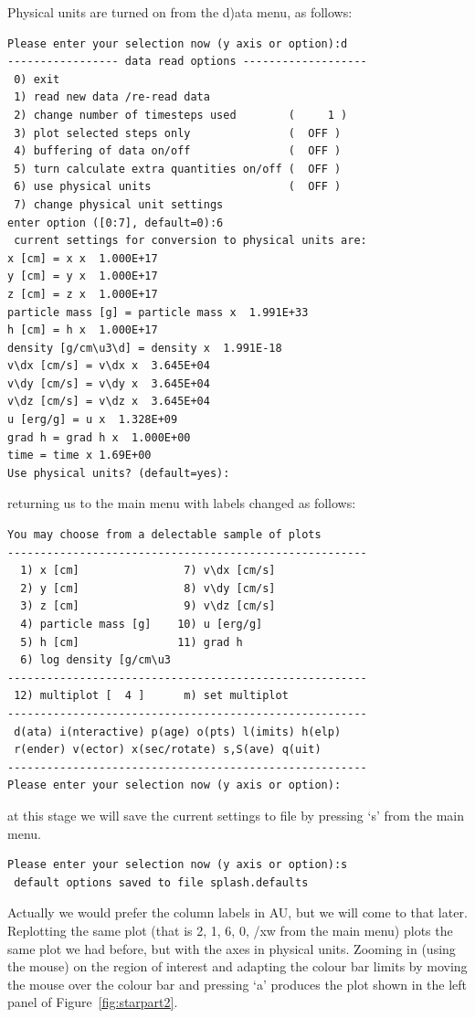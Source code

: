 \documentclass[a4paper,11pt]{article}
\begin{document}
 Physical units are turned on from the d)ata menu, as follows:
\begin{verbatim}
Please enter your selection now (y axis or option):d
----------------- data read options -------------------
 0) exit 
 1) read new data /re-read data
 2) change number of timesteps used        (     1 )
 3) plot selected steps only               (  OFF )
 4) buffering of data on/off               (  OFF )
 5) turn calculate extra quantities on/off (  OFF )
 6) use physical units                     (  OFF )
 7) change physical unit settings 
enter option ([0:7], default=0):6
 current settings for conversion to physical units are:
x [cm] = x x  1.000E+17
y [cm] = y x  1.000E+17
z [cm] = z x  1.000E+17
particle mass [g] = particle mass x  1.991E+33
h [cm] = h x  1.000E+17
density [g/cm\u3\d] = density x  1.991E-18
v\dx [cm/s] = v\dx x  3.645E+04
v\dy [cm/s] = v\dy x  3.645E+04
v\dz [cm/s] = v\dz x  3.645E+04
u [erg/g] = u x  1.328E+09
grad h = grad h x  1.000E+00
time = time x 1.69E+00
Use physical units? (default=yes):
\end{verbatim}
returning us to the main menu with labels changed as follows:
\begin{verbatim}
You may choose from a delectable sample of plots 
-------------------------------------------------------
  1) x [cm]                7) v\dx [cm/s]         
  2) y [cm]                8) v\dy [cm/s]         
  3) z [cm]                9) v\dz [cm/s]         
  4) particle mass [g]    10) u [erg/g]           
  5) h [cm]               11) grad h              
  6) log density [g/cm\u3
-------------------------------------------------------
 12) multiplot [  4 ]      m) set multiplot 
-------------------------------------------------------
 d(ata) i(nteractive) p(age) o(pts) l(imits) h(elp)
 r(ender) v(ector) x(sec/rotate) s,S(ave) q(uit)
-------------------------------------------------------
Please enter your selection now (y axis or option):
\end{verbatim}
at this stage we will save the current settings to file by pressing `s' from the main menu.
\begin{verbatim}
Please enter your selection now (y axis or option):s
 default options saved to file splash.defaults
\end{verbatim}
Actually we would prefer the column labels in AU, but we will come to that later. Replotting the same plot (that is 2, 1, 6, 0, /xw from the main menu) plots the same plot we had before, but with the axes in physical units. Zooming in (using the mouse) on the region of interest and adapting the colour bar limits by moving the mouse over the colour bar and pressing `a' produces the plot shown in the left panel of Figure~\ref{fig:starpart2}. 
\end{document}
